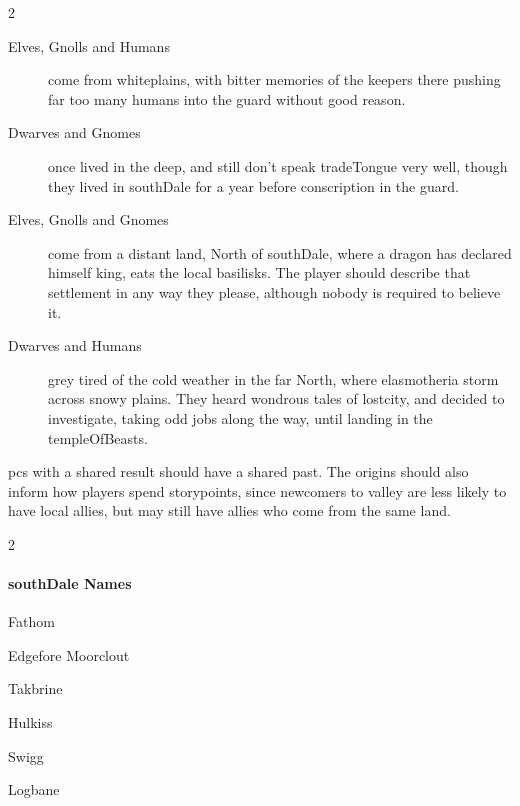 \begin{multicols}{2}
\begin{dlist}
\begin{description}
  \end{description}
  \item
  \begin{description}
    \item[Elves, Gnolls and Humans]
    come from \gls{whiteplains}, with bitter memories of the \glspl{keeper} there pushing far too many humans into the \gls{guard} without good reason.
    \item[Dwarves and Gnomes]
    once lived in the \gls{deep}, and still don't speak \gls{tradeTongue} very well, though they lived in \gls{southDale} for a year before conscription in the \gls{guard}.
  \end{description}
  \item
  \begin{description}
    \item[Elves, Gnolls and Gnomes]
    come from a distant land, North of \gls{southDale}, where a dragon has declared himself king, eats the local basilisks.
    The player should describe that settlement in any way they please, although nobody is required to believe it.
    \item[Dwarves and Humans]
    grey tired of the cold weather in the far North, where elasmotheria storm across snowy plains.
    They heard wondrous tales of \gls{lostcity}, and decided to investigate, taking odd jobs along the way, until landing in the \gls{templeOfBeasts}.
  \end{description}
\end{dlist}

\Glspl{pc} with a shared result should have a shared past.
The origins should also inform how players spend \glspl{storypoint},%
since newcomers to \gls{valley} are less likely to have local allies, but may still have allies who come from the same land.

\begin{multicols}{2}

\paragraph{\Gls{southDale} Names}

\begin{dlist}
  \item
  Fathom
  \item
  \ifodd\thefenestraDay%
    Edgefore
  \else%
    Moorclout
  \fi%
  \item
  Takbrine
  \item
  Hulkiss
  \item
  Swigg
  \item
  Logbane
\end{dlist}


\end{multicols}
\end{multicols}
